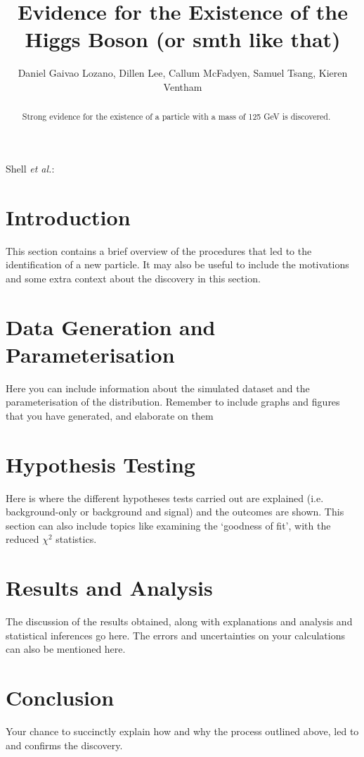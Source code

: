 \documentclass[11pt,journal]{discovery_paper}
\begin{document}
\title{Evidence for the Existence of the Higgs Boson (or smth like that)}

\author{Daniel Gaivao Lozano, Dillen Lee, Callum McFadyen, Samuel Tsang, Kieren Ventham}

%
{Shell \MakeLowercase{\textit{et al.}}:}


\maketitle

\begin{abstract}
Strong evidence for the existence of a particle with a mass of 125 GeV is discovered.
\end{abstract}


\section{Introduction}
This section contains a brief overview of the procedures that led to the identification of a new particle. It may also be useful to include the motivations and some extra context about the discovery in this section.


\section{Data Generation and Parameterisation}
Here you can include information about the simulated dataset and the parameterisation of the distribution. Remember to include graphs and figures that you have generated, and elaborate on them


\section{Hypothesis Testing}
Here is where the different hypotheses tests carried out are explained (i.e. background-only or background and signal) and the outcomes are shown.  This section can also include topics like examining the ‘goodness of fit’, with the reduced ${\chi}^2$ statistics.


\section{Results and Analysis}
The discussion of the results obtained, along with explanations and analysis and statistical inferences go here. The errors and uncertainties on your calculations can also be mentioned here.


\section{Conclusion}
Your chance to succinctly explain how and why the process outlined above, led to and confirms the discovery.
\end{document}
